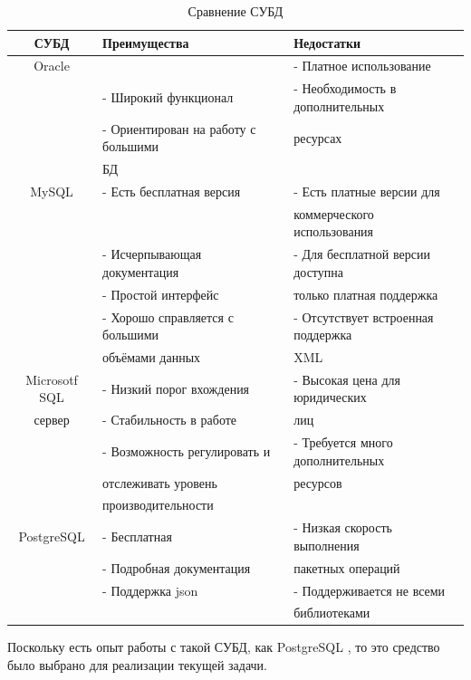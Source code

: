 		\begin{table}[pt!] 
			\begin{center}
				\caption{Сравнение СУБД}
				\label{cmptable}
				\begin{tabular}{| c | l | l |}
					\hline
					\textbf{СУБД} 	& \textbf{Преимущества} & \textbf{Недостатки} \\
					\hline
					Oracle 			&  & - Платное использование \\ 
									& - Широкий функционал & - Необходимость в дополнительных \\
									& - Ориентирован на работу с большими &  ресурсах \\
									& БД & \\
					\hline
					MySQL 			& - Есть бесплатная версия &	- Есть платные версии для \\
									&  & коммерческого использования \\ 
									& - Исчерпывающая документация & - Для бесплатной версии доступна \\
									& - Простой интерфейс & только платная поддержка \\
									& - Хорошо справляется с большими & - Отсутствует встроенная поддержка \\
									& объёмами данных & XML \\
					\hline
					Microsotf SQL  	& - Низкий порог вхождения &	- Высокая цена для юридических \\
					сервер 			& - Стабильность в работе & лиц \\ 
									& - Возможность регулировать и  & - Требуется много дополнительных \\
									& отслеживать уровень & ресурсов \\ 
									& производительности &  \\
					\hline
					PostgreSQL 		& - Бесплатная & - Низкая скорость выполнения \\ 
									& - Подробная документация & пакетных операций\\
									& - Поддержка json & - Поддерживается не всеми \\
									&& библиотеками \\
					\hline
				\end{tabular}
			\end{center}
		\end{table}
	\newpage
	
	Поскольку есть опыт работы с такой СУБД, как PostgreSQL \cite{postgresql}, то это средство было выбрано для реализации текущей задачи.
	
